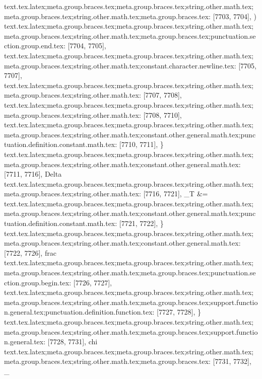 {{{{{{{{{{{{{{{{{{{{{{{{{{{{{{{{{{{{{{{{{{{{{{{{{{{{{{{{{{{{{{{{{{{{{{{{{{{{{{{{{{{{{{{{{{{{{{{{{{{{{{{{{{{{{{{{{{{{{{{{{{{{{{{{{{{{{{{{{{{{{{{{{{{{{{{{{{{{{{{{{{{{{{{{{{{{{{{{{{{{{{{{{{{{{{{{{{{{{{{{{{{{{{{{{{{{{{{{{{text.tex.latex;meta.group.braces.tex;meta.group.braces.tex;string.other.math.tex;meta.group.braces.tex;string.other.math.tex;meta.group.braces.tex: [7703, 7704], {)}
text.tex.latex;meta.group.braces.tex;meta.group.braces.tex;string.other.math.tex;meta.group.braces.tex;string.other.math.tex;meta.group.braces.tex;punctuation.section.group.end.tex: [7704, 7705], {}}
text.tex.latex;meta.group.braces.tex;meta.group.braces.tex;string.other.math.tex;meta.group.braces.tex;string.other.math.tex;constant.character.newline.tex: [7705, 7707], {\\}
text.tex.latex;meta.group.braces.tex;meta.group.braces.tex;string.other.math.tex;meta.group.braces.tex;string.other.math.tex: [7707, 7708], {
}
text.tex.latex;meta.group.braces.tex;meta.group.braces.tex;string.other.math.tex;meta.group.braces.tex;string.other.math.tex: [7708, 7710], {  }
text.tex.latex;meta.group.braces.tex;meta.group.braces.tex;string.other.math.tex;meta.group.braces.tex;string.other.math.tex;constant.other.general.math.tex;punctuation.definition.constant.math.tex: [7710, 7711], {\}
text.tex.latex;meta.group.braces.tex;meta.group.braces.tex;string.other.math.tex;meta.group.braces.tex;string.other.math.tex;constant.other.general.math.tex: [7711, 7716], {Delta}
text.tex.latex;meta.group.braces.tex;meta.group.braces.tex;string.other.math.tex;meta.group.braces.tex;string.other.math.tex: [7716, 7721], {_T &=}
text.tex.latex;meta.group.braces.tex;meta.group.braces.tex;string.other.math.tex;meta.group.braces.tex;string.other.math.tex;constant.other.general.math.tex;punctuation.definition.constant.math.tex: [7721, 7722], {\}
text.tex.latex;meta.group.braces.tex;meta.group.braces.tex;string.other.math.tex;meta.group.braces.tex;string.other.math.tex;constant.other.general.math.tex: [7722, 7726], {frac}
text.tex.latex;meta.group.braces.tex;meta.group.braces.tex;string.other.math.tex;meta.group.braces.tex;string.other.math.tex;meta.group.braces.tex;punctuation.section.group.begin.tex: [7726, 7727], {{}
text.tex.latex;meta.group.braces.tex;meta.group.braces.tex;string.other.math.tex;meta.group.braces.tex;string.other.math.tex;meta.group.braces.tex;support.function.general.tex;punctuation.definition.function.tex: [7727, 7728], {\}
text.tex.latex;meta.group.braces.tex;meta.group.braces.tex;string.other.math.tex;meta.group.braces.tex;string.other.math.tex;meta.group.braces.tex;support.function.general.tex: [7728, 7731], {chi}
text.tex.latex;meta.group.braces.tex;meta.group.braces.tex;string.other.math.tex;meta.group.braces.tex;string.other.math.tex;meta.group.braces.tex: [7731, 7732], {_}
}}}}}}}}}}}}}}}}}}}}}}}}}}}}}}}}}}}}}}}}}}}}}}}}}}}}}}}}}}}}}}}}}}}}}}}}}}}}}}}}}}}}}}}}}}}}}}}}}}}}}}}}}}}}}}}}}}}}}}}}}}}}}}}}}}}}}}}}}}}}}}}}}}}}}}}}}}}}}}}}}}}}}}}}}}}}}}}}}}}}}}}}}}}}}}}}}}}}}}}}}}}}}}}}}}}}}}}}}}}}}
